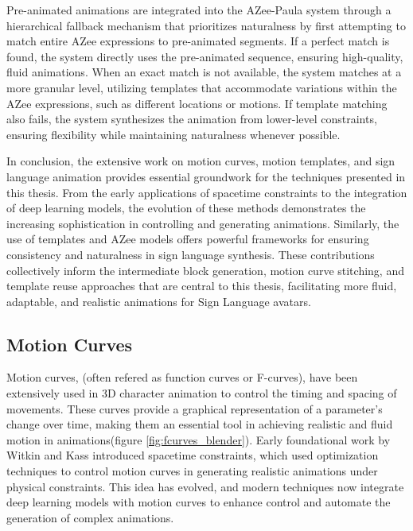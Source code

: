 \documentclass[../../main.tex]{subfiles}
\begin{document}
Pre-animated animations are integrated into the AZee-Paula system through a hierarchical fallback mechanism that prioritizes naturalness by first attempting to match entire AZee expressions to pre-animated segments. If a perfect match is found, the system directly uses the pre-animated sequence, ensuring high-quality, fluid animations. When an exact match is not available, the system matches at a more granular level, utilizing templates that accommodate variations within the AZee expressions, such as different locations or motions. If template matching also fails, the system synthesizes the animation from lower-level constraints, ensuring flexibility while maintaining naturalness whenever possible.

In conclusion, the extensive work on motion curves, motion templates, and sign language animation provides essential groundwork for the techniques presented in this thesis. From the early applications of spacetime constraints to the integration of deep learning models, the evolution of these methods demonstrates the increasing sophistication in controlling and generating animations. Similarly, the use of templates and AZee models offers powerful frameworks for ensuring consistency and naturalness in sign language synthesis. These contributions collectively inform the intermediate block generation, motion curve stitching, and template reuse approaches that are central to this thesis, facilitating more fluid, adaptable, and realistic animations for Sign Language avatars.

\subsection{Motion Curves}
\label{subsec:motion_curves}

Motion curves, (often refered as function curves or F-curves), have been extensively used in 3D character animation to control the timing and spacing of movements. These curves provide a graphical representation of a parameter's change over time, making them an essential tool in achieving realistic and fluid motion in animations(figure \ref{fig:fcurves_blender}). Early foundational work by Witkin and Kass \cite{witkin1988spacetime} introduced spacetime constraints, which used optimization techniques to control motion curves in generating realistic animations under physical constraints. This idea has evolved, and modern techniques now integrate deep learning models with motion curves to enhance control and automate the generation of complex animations.
\end{document}
